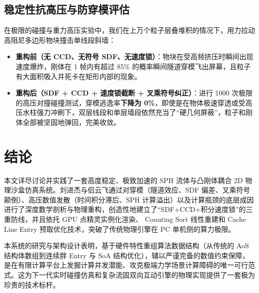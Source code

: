 \documentclass[11pt,a4paper]{article}
\begin{document}
\subsection{稳定性抗高压与防穿模评估}
在极限的碰撞与重力高压实验中，我们在上万个粒子层叠堆积的情况下，用力拉动高阻尼多边形物块撞击单线段斜墙：
\begin{itemize}
    \item \textbf{重构前（无 CCD、无符号 SDF、无速度锁）}：物块在受高频挤压时瞬间出现速度爆炸，刚体在 1 帧内有超过 $85\%$ 的概率瞬间隧道穿模飞出屏幕，且粒子有大面积吸入并死卡在矩形内部的现象。
    \item \textbf{重构后（SDF + CCD + 速度锁截断 + 叉乘符号纠正）}：进行 1000 次极限的高压对撞碰撞测试，穿模逃逸率\textbf{下降为 0\%}，即使是在物体极速穿透或受高压水柱强力冲刷下，双层线段和单层墙段依然充当了“硬几何屏蔽”，粒子和刚体全部被坚固地弹回，完美收敛。
\end{itemize}

\section{结论}
本文详尽讨论并实践了一套高度稳定、极致加速的 SPH 流体与凸刚体耦合 2D 物理沙盒仿真系统。刘进杰与侣云飞通过对穿模（隧道效应、SDF 偏差、叉乘符号颠倒）、高压数值发散（时间积分滞后、SPH 计算溢出）以及计算瓶颈的底层成因进行了深度数学剖析与物理重构，创造性地建立了“SDF+CCD+积分速度锁”的三重防线，并且依托 GPU 点精灵实例化渲染、 Counting Sort 线性重建和 Cache Line Entry 预取优化技术，突破了传统物理引擎在 PC 单机侧的算力极限。

本系统的研究与架构设计表明，基于硬件特性重组算法数据结构（从传统的 AoS 结构体数组到连续胖 Entry 与 SoA 结构优化），辅以严谨完备的数值约束保障，是在有限计算平台上发掘计算并发潜能、攻克极端力学场景计算障碍的唯一可行范式。这为下一代实时碰撞仿真和复杂流固双向互动引擎的物理实现提供了一套极为珍贵的技术标杆。
\end{document}
